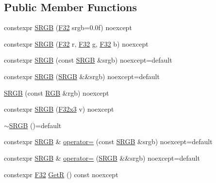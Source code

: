 \subsection*{Public Member Functions}
\begin{DoxyCompactItemize}
\item 
constexpr \mbox{\hyperlink{structmage_1_1_s_r_g_b_a5f1cc4d90aaa3801f1146eb767d45476}{S\+R\+GB}} (\mbox{\hyperlink{namespacemage_aa97e833b45f06d60a0a9c4fc22ae02c0}{F32}} srgb=0.\+0f) noexcept
\item 
constexpr \mbox{\hyperlink{structmage_1_1_s_r_g_b_acf4eb424d13f8ee60065c3d7e118987b}{S\+R\+GB}} (\mbox{\hyperlink{namespacemage_aa97e833b45f06d60a0a9c4fc22ae02c0}{F32}} r, \mbox{\hyperlink{namespacemage_aa97e833b45f06d60a0a9c4fc22ae02c0}{F32}} g, \mbox{\hyperlink{namespacemage_aa97e833b45f06d60a0a9c4fc22ae02c0}{F32}} b) noexcept
\item 
constexpr \mbox{\hyperlink{structmage_1_1_s_r_g_b_a3b895db44e4e6cc72249fadc093cf084}{S\+R\+GB}} (const \mbox{\hyperlink{structmage_1_1_s_r_g_b}{S\+R\+GB}} \&srgb) noexcept=default
\item 
constexpr \mbox{\hyperlink{structmage_1_1_s_r_g_b_aca835f4281827524ad14345ddb28208a}{S\+R\+GB}} (\mbox{\hyperlink{structmage_1_1_s_r_g_b}{S\+R\+GB}} \&\&srgb) noexcept=default
\item 
\mbox{\hyperlink{structmage_1_1_s_r_g_b_a4b56eeabfaee47d0f0685a061947ce59}{S\+R\+GB}} (const \mbox{\hyperlink{structmage_1_1_r_g_b}{R\+GB}} \&rgb) noexcept
\item 
constexpr \mbox{\hyperlink{structmage_1_1_s_r_g_b_abb02103839b539049a6dd54dd7936b16}{S\+R\+GB}} (\mbox{\hyperlink{namespacemage_a0fef5ab4e073c2d9ea876fefa3da4233}{F32x3}} v) noexcept
\item 
\mbox{\hyperlink{structmage_1_1_s_r_g_b_aa5bb0738c6026da6c3e4f54869c52cbc}{$\sim$\+S\+R\+GB}} ()=default
\item 
constexpr \mbox{\hyperlink{structmage_1_1_s_r_g_b}{S\+R\+GB}} \& \mbox{\hyperlink{structmage_1_1_s_r_g_b_ab4feb5cd04c21c03d2278468e3241562}{operator=}} (const \mbox{\hyperlink{structmage_1_1_s_r_g_b}{S\+R\+GB}} \&srgb) noexcept=default
\item 
constexpr \mbox{\hyperlink{structmage_1_1_s_r_g_b}{S\+R\+GB}} \& \mbox{\hyperlink{structmage_1_1_s_r_g_b_aef2e40794d1465801e998d64d94f782d}{operator=}} (\mbox{\hyperlink{structmage_1_1_s_r_g_b}{S\+R\+GB}} \&\&srgb) noexcept=default
\item 
constexpr \mbox{\hyperlink{namespacemage_aa97e833b45f06d60a0a9c4fc22ae02c0}{F32}} \mbox{\hyperlink{structmage_1_1_s_r_g_b_a0089fdce78dc4da495323f0f6a162546}{GetR}} () const noexcept

\end{DoxyCompactItemize}
